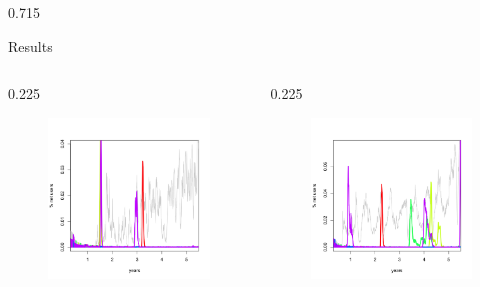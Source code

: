 \documentclass[final]{beamer} %
\newcommand{\spaceProp}{0.02}
\newcommand{\spacer}{\begin{column}{\spaceProp\paperwidth}\end{column}}
\newenvironment{oneCol}{\begin{column}[t]{0.225\paperwidth}}{\end{column}}
\newenvironment{threeCol}{\begin{column}[t]{0.715\paperwidth}}{\end{column}}
\begin{document}
\begin{frame}{}
\begin{columns}[t]
\begin{threeCol}
\begin{block}{Results}
\begin{columns}
\begin{oneCol}
\begin{figure}
        \includegraphics[width=1.0\linewidth]{out90.png}
      \end{figure}  
    \end{oneCol}
    \begin{oneCol}
      \begin{figure}
        \includegraphics[width=1.0\linewidth]{out7.png}

\end{figure}
\end{oneCol}
\end{columns}
\end{block}
\end{threeCol}
\end{columns}
\end{frame}
\end{document}
